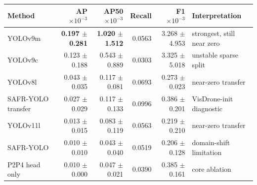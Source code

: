\begin{tabular}{lrrrrl}
\toprule
Method & AP $\times 10^{-3}$ & AP50 $\times 10^{-3}$ & Recall & F1 $\times 10^{-3}$ & Interpretation \\
\midrule
YOLOv9m & \textbf{0.197 $\pm$ 0.281} & \textbf{1.020 $\pm$ 1.512} & 0.0563 & 3.268 $\pm$ 4.953 & strongest, still near zero \\
YOLOv9c & 0.123 $\pm$ 0.188 & 0.543 $\pm$ 0.889 & 0.0303 & 3.325 $\pm$ 5.018 & unstable sparse split \\
YOLOv8l & 0.043 $\pm$ 0.035 & 0.117 $\pm$ 0.081 & 0.0693 & 0.273 $\pm$ 0.023 & near-zero transfer \\
SAFR-YOLO transfer & 0.027 $\pm$ 0.029 & 0.117 $\pm$ 0.133 & 0.0996 & 0.386 $\pm$ 0.201 & VisDrone-init diagnostic \\
YOLOv11l & 0.013 $\pm$ 0.015 & 0.083 $\pm$ 0.119 & 0.0563 & 0.219 $\pm$ 0.210 & near-zero transfer \\
SAFR-YOLO & 0.010 $\pm$ 0.010 & 0.043 $\pm$ 0.040 & 0.0519 & 0.206 $\pm$ 0.128 & domain-shift limitation \\
P2P4 head only & 0.010 $\pm$ 0.000 & 0.047 $\pm$ 0.021 & 0.0390 & 0.385 $\pm$ 0.161 & core ablation \\
\bottomrule
\end{tabular}
